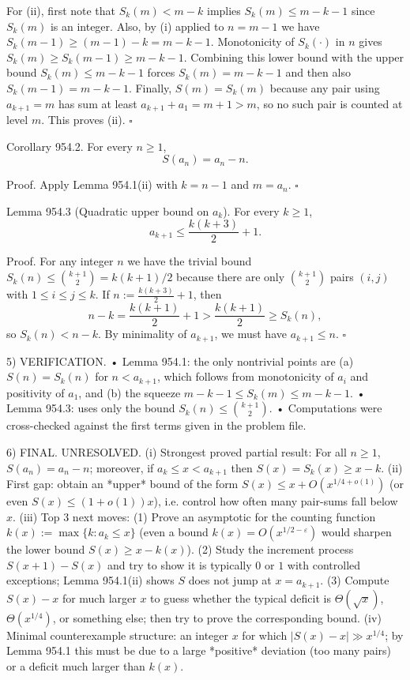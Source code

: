 For (ii), first note that $S_k(m)<m-k$ implies $S_k(m)\le m-k-1$ since $S_k(m)$ is an integer.
Also, by (i) applied to $n=m-1$ we have
$S_k(m-1)\ge (m-1)-k=m-k-1$.
Monotonicity of $S_k(\cdot)$ in $n$ gives $S_k(m)\ge S_k(m-1)\ge m-k-1$.
Combining this lower bound with the upper bound $S_k(m)\le m-k-1$ forces
$S_k(m)=m-k-1$ and then also $S_k(m-1)=m-k-1$.
Finally, $S(m)=S_k(m)$ because any pair using $a_{k+1}=m$ has sum at least $a_{k+1}+a_1=m+1>m$, so no such pair is counted at level $m$.
This proves (ii). \hfill $\square$

Corollary 954.2.
For every $n\ge 1$,
\[
S(a_n)=a_n-n.
\]

Proof.
Apply Lemma 954.1(ii) with $k=n-1$ and $m=a_n$. \hfill $\square$

Lemma 954.3 (Quadratic upper bound on $a_{k}$).
For every $k\ge 1$,
\[
a_{k+1}\le \frac{k(k+3)}{2}+1.
\]

Proof.
For any integer $n$ we have the trivial bound $S_k(n)\le \binom{k+1}{2}=k(k+1)/2$ because there are only $\binom{k+1}{2}$ pairs $(i,j)$ with $1\le i\le j\le k$.
If $n:=\frac{k(k+3)}{2}+1$, then
\[
n-k=\frac{k(k+1)}{2}+1>\frac{k(k+1)}{2}\ge S_k(n),
\]
so $S_k(n)<n-k$. By minimality of $a_{k+1}$, we must have $a_{k+1}\le n$.
\hfill $\square$

5) VERIFICATION.
• Lemma 954.1: the only nontrivial points are (a) $S(n)=S_k(n)$ for $n<a_{k+1}$, which follows from monotonicity of $a_i$ and positivity of $a_1$, and (b) the squeeze $m-k-1\le S_k(m)\le m-k-1$.
• Lemma 954.3: uses only the bound $S_k(n)\le \binom{k+1}{2}$.
• Computations were cross-checked against the first terms given in the problem file.

6) FINAL.
UNRESOLVED.
(i) Strongest proved partial result: For all $n\ge 1$, $S(a_n)=a_n-n$; moreover, if $a_k\le x<a_{k+1}$ then $S(x)=S_k(x)\ge x-k$.
(ii) First gap: obtain an *upper* bound of the form $S(x)\le x+O(x^{1/4+o(1)})$ (or even $S(x)\le (1+o(1))x$), i.e. control how often many pair-sums fall below $x$.
(iii) Top 3 next moves:
  (1) Prove an asymptotic for the counting function $k(x):=\max\{k: a_k\le x\}$ (even a bound $k(x)=O(x^{1/2-\varepsilon})$ would sharpen the lower bound $S(x)\ge x-k(x)$).
  (2) Study the increment process $S(x+1)-S(x)$ and try to show it is typically $0$ or $1$ with controlled exceptions; Lemma 954.1(ii) shows $S$ does not jump at $x=a_{k+1}$.
  (3) Compute $S(x)-x$ for much larger $x$ to guess whether the typical deficit is $\Theta(\sqrt{x})$, $\Theta(x^{1/4})$, or something else; then try to prove the corresponding bound.
(iv) Minimal counterexample structure: an integer $x$ for which $|S(x)-x|\gg x^{1/4}$; by Lemma 954.1 this must be due to a large *positive* deviation (too many pairs) or a deficit much larger than $k(x)$.




